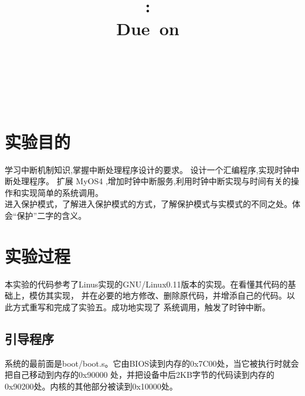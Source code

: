 \documentclass[a4paper]{article}
\title{
\vspace{2in}
\textmd{\textbf{\hmwkClass:\ \hmwkTitle}}\\
\normalsize\vspace{0.1in}\small{Due\ on\ \hmwkDueDate}\\
\vspace{0.1in}\large{\textit{\hmwkClassInstructor\ \hmwkClassTime}}
\vspace{3in}
}
\author{\textbf{\LARGE{\hmwkAuthorName}} \\ \\ \textbf{\LARGE{\hmwkAuthorId}}}
\date{} %
\begin{document}

\maketitle




\renewcommand{\contentsname}{Content} %
\newpage
\tableofcontents
{}
\newpage



\section{实验目的}
学习中断机制知识,掌握中断处理程序设计的要求。
设计一个汇编程序,实现时钟中断处理程序。
扩展 MyOS4 ,增加时钟中断服务,利用时钟中断实现与时间有关的操作和实现简单的系统调用。 \\ 

进入保护模式，了解进入保护模式的方式，了解保护模式与实模式的不同之处。体会“保护”二字的含义。

\section{实验过程}
    本实验的代码参考了Linus实现的GNU/Linux0.11版本的实现。在看懂其代码的基础上，模仿其实现，
    并在必要的地方修改、删除原代码，并增添自己的代码。以此方式重写和完成了实验五。成功地实现了
    系统调用，触发了时钟中断。
    \subsection{引导程序}
    系统的最前面是boot/boot.s。它由BIOS读到内存的0x7C00处，当它被执行时就会把自己移动到内存的0x90000
    处，并把设备中后2KB字节的代码读到内存的0x90200处。内核的其他部分被读到0x10000处。
\end{document}
